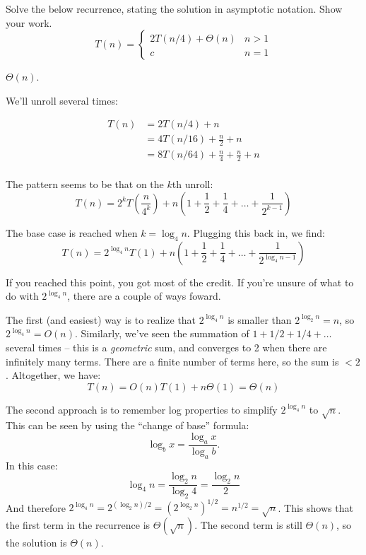 \begin{prob}
    Solve the below recurrence, stating the solution in asymptotic notation. Show your work.
    \[
        T(n) =
        \begin{cases}
            2 T(n/4) + \Theta(n) & n > 1 \\
            c & n = 1
        \end{cases}
    \]

    \begin{soln}
        $\Theta(n)$.

        We'll unroll several times:

        \[
        \begin{aligned}
            T(n)
            &=
                2 T(n/4) + n
                \\
            &=
                4 T(n/16) + \frac{n}{2} + n
                \\
            &=
            8 T(n/64) + \frac{n}{4} + \frac{n}{2} + n
                \\
        \end{aligned}
        \]

        The pattern seems to be that on the $k$th unroll:
        \[
            T(n) = 2^k T\left( \frac{n}{4^k} \right) +
                n \left(
                    1 + \frac12 + \frac14 + \ldots + \frac{1}{2^{k-1}}
                \right)
        \]

        The base case is reached when $k = \log_4 n$. Plugging this back in, we find:
        \[
            T(n) = 2^{\log_4 n} T(1) + n \left(1 + \frac12 + \frac 14 + \ldots + \frac{1}{2^{\log_4 n - 1}}\right)
        \]

        If you reached this point, you got most of the credit. If you're unsure
        of what to do with $2^{\log_4 n}$, there are a couple of ways foward.

        The first (and easiest) way is to realize that $2^{\log_4 n}$ is
        smaller than $2^{\log_2 n} = n$, so $2^{\log_4 n} = O(n)$. Similarly,
        we've seen the summation of $1 + 1/2 + 1/4 + \ldots$ several times --
        this is a \textit{geometric} sum, and converges to 2 when there are
        infinitely many terms. There are a finite number of terms here, so the
        sum is $< 2$. Altogether, we have:
        \[
            T(n) = O(n) T(1) + n \Theta(1) = \Theta(n)
        \]

        The second approach is to remember log properties to simplify $2^{\log_4 n}$ to $\sqrt{n}$. This can be seen
        by using the ``change of base'' formula:
        \[
            \log_b x = \frac{\log_a x}{\log_a b}.
        \]
        In this case:
        \[
            \log_4 n = \frac{\log_2 n}{\log_2 4} = \frac{\log_2 n}{2}
        \]
        And therefore $2^{\log_4 n} = 2^{(\log_2 n) / 2} = \left(2^{\log_2
        n}\right)^{1/2} = n^{1/2} = \sqrt n$. This shows that the first term in
        the recurrence is $\Theta(\sqrt n)$. The second term is still
        $\Theta(n)$, so the solution is $\Theta(n)$.
    \end{soln}
\end{prob}
